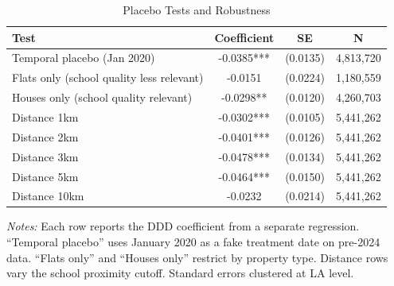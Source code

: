 \begin{table}[htbp]
\centering
\caption{Placebo Tests and Robustness}
\label{tab:placebos}
\begin{tabular}{lccc}
\hline\hline
Test & Coefficient & SE & N \\
\hline
Temporal placebo (Jan 2020)  &  -0.0385***  & (0.0135) & 4,813,720 \\
Flats only (school quality less relevant)  &  -0.0151  & (0.0224) & 1,180,559 \\
Houses only (school quality relevant)  &  -0.0298**  & (0.0120) & 4,260,703 \\
Distance 1km  &  -0.0302***  & (0.0105) & 5,441,262 \\
Distance 2km  &  -0.0401***  & (0.0126) & 5,441,262 \\
Distance 3km  &  -0.0478***  & (0.0134) & 5,441,262 \\
Distance 5km  &  -0.0464***  & (0.0150) & 5,441,262 \\
Distance 10km  &  -0.0232  & (0.0214) & 5,441,262 \\
\hline\hline
\end{tabular}
\begin{tablenotes}\small
\item \textit{Notes:} Each row reports the DDD coefficient from a separate regression. ``Temporal placebo'' uses January 2020 as a fake treatment date on pre-2024 data. ``Flats only'' and ``Houses only'' restrict by property type. Distance rows vary the school proximity cutoff. Standard errors clustered at LA level.
\end{tablenotes}
\end{table}
